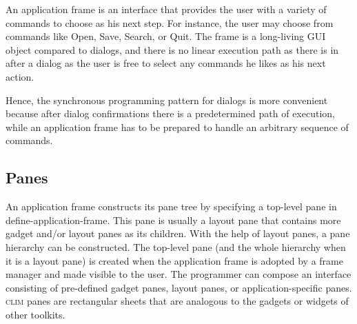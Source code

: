 \documentclass[twocolumn,a4paper]{article}
\newcommand {\code}[1]{{\sffamily #1}}
\newcommand {\CLIM}{\textsc{clim}}
\let\method\code
\let\macro\code
\begin{document}
An application frame is an interface that provides the user with a
variety of commands to choose as his next step. For instance, the user
may choose from commands like Open, Save, Search, or Quit. The frame
is a long-living GUI object compared to dialogs, and there is no linear
execution path as there is in after a dialog as the user is free to
select any commands he likes as his next action.

Hence, the synchronous programming pattern for dialogs is more
convenient because after dialog confirmations there is a predetermined
path of execution, while an application frame has to be prepared to
handle an arbitrary sequence of commands.




\subsection{Panes}

An application frame constructs its pane tree by specifying a
top-level pane in \macro{define-application-frame}. This pane is
usually a layout pane that contains more gadget and/or layout panes as
its children. With the help of layout panes, a pane hierarchy can be
constructed. The top-level pane (and the whole hierarchy when it is a
layout pane) is created when the application frame is adopted by a
frame manager and made visible to the user. The programmer can compose
an interface consisting of pre-defined gadget panes, layout panes, or
application-specific panes. \CLIM{} panes are rectangular sheets that
are analogous to the gadgets or widgets of other toolkits.
\end{document}
